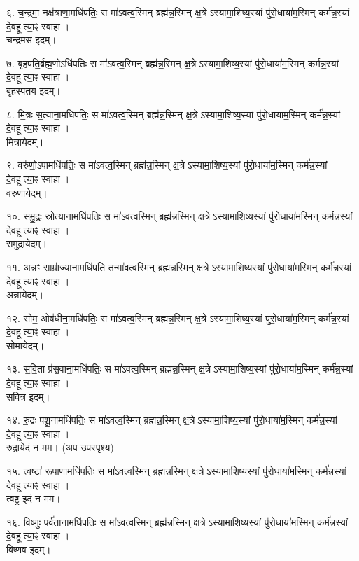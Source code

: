 ६. च॒न्द्रमा॒ नक्ष॑त्राणा॒मधि॑पतिः॒ स मा॑ऽवत्व॒स्मिन् ब्रह्म॑न्न॒स्मिन् क्ष॒त्रेऽस्यामा॒शिष्य॒स्यां पु॑रो॒धाया॑म॒स्मिन् कर्म॑न्न॒स्यां दे॒वहूत्या॒ꣴ स्वाहा।\\
चन्द्रमस इदम्।

७. बृह॒पति॒र्ब्रह्म॒णोऽधि॑पतिः स मा॑ऽवत्व॒स्मिन् ब्रह्म॑न्न॒स्मिन् क्ष॒त्रेऽस्यामा॒शिष्य॒स्यां पु॑रो॒धाया॑म॒स्मिन् कर्म॑न्न॒स्यां दे॒वहूत्या॒ꣴ स्वाहा।\\
बृहस्पतय इदम्।

८. मि॒त्रः स॒त्याना॒मधि॑पतिः॒ स मा॑ऽवत्व॒स्मिन् ब्रह्म॑न्न॒स्मिन् क्ष॒त्रेऽस्यामा॒शिष्य॒स्यां पु॑रो॒धाया॑म॒स्मिन् कर्म॑न्न॒स्यां दे॒वहूत्या॒ꣴ स्वाहा।\\
मित्रायेदम्।

९. वरु॑णो॒ऽपामधि॑पतिः॒ स मा॑ऽवत्व॒स्मिन् ब्रह्म॑न्न॒स्मिन् क्ष॒त्रेऽस्यामा॒शिष्य॒स्यां पु॑रो॒धाया॑म॒स्मिन् कर्म॑न्न॒स्यां दे॒वहूत्या॒ꣴ स्वाहा।\\
वरुणायेदम्।

१०. स॒मु॒द्रः स्रो॒त्याना॒मधि॑पतिः॒ स मा॑ऽवत्व॒स्मिन् ब्रह्म॑न्न॒स्मिन् क्ष॒त्रेऽस्यामा॒शिष्य॒स्यां पु॑रो॒धाया॑म॒स्मिन् कर्म॑न्न॒स्यां दे॒वहूत्या॒ꣴ स्वाहा।\\
समुद्रायेदम्।

११. अन्न॒ꣳ साम्रा॑॑ज्याना॒मधि॑पति॒ तन्मा॑वत्व॒स्मिन् ब्रह्म॑न्न॒स्मिन् क्ष॒त्रेऽस्यामा॒शिष्य॒स्यां पु॑रो॒धाया॑म॒स्मिन् कर्म॑न्न॒स्यां दे॒वहूत्या॒ꣴ स्वाहा।\\
अन्नायेदम्।

१२. सोम॒ ओष॑धीना॒मधि॑पतिः॒ स मा॑ऽवत्व॒स्मिन् ब्रह्म॑न्न॒स्मिन् क्ष॒त्रेऽस्यामा॒शिष्य॒स्यां पु॑रो॒धाया॑म॒स्मिन् कर्म॑न्न॒स्यां दे॒वहूत्या॒ꣴ स्वाहा।\\
सोमायेदम्।

१३. स॒वि॒ता प्र॑स॒वाना॒मधि॑पतिः॒ स मा॑ऽवत्व॒स्मिन् ब्रह्म॑न्न॒स्मिन् क्ष॒त्रेऽस्यामा॒शिष्य॒स्यां पु॑रो॒धाया॑म॒स्मिन् कर्म॑न्न॒स्यां दे॒वहूत्या॒ꣴ स्वाहा।\\
सवित्र इदम्।

१४. रु॒द्रः प॑शू॒नामधि॑पतिः॒ स मा॑ऽवत्व॒स्मिन् ब्रह्म॑न्न॒स्मिन् क्ष॒त्रेऽस्यामा॒शिष्य॒स्यां पु॑रो॒धाया॑म॒स्मिन् कर्म॑न्न॒स्यां दे॒वहूत्या॒ꣴ स्वाहा।\\
रुद्रायेदं न मम। (अप उपस्पृश्य)

१५. त्वष्टा॑ रू॒पाणा॒मधि॑पतिः॒ स मा॑ऽवत्व॒स्मिन् ब्रह्म॑न्न॒स्मिन् क्ष॒त्रेऽस्यामा॒शिष्य॒स्यां पु॑रो॒धाया॑म॒स्मिन् कर्म॑न्न॒स्यां दे॒वहूत्या॒ꣴ स्वाहा।\\
त्वष्ट्र इदं न मम।

१६. विष्णुः॒ पर्व॑ताना॒मधि॑पतिः॒ स मा॑ऽवत्व॒स्मिन् ब्रह्म॑न्न॒स्मिन् क्ष॒त्रेऽस्यामा॒शिष्य॒स्यां पु॑रो॒धाया॑म॒स्मिन् कर्म॑न्न॒स्यां दे॒वहूत्या॒ꣴ स्वाहा।\\
विष्णव इदम्।

